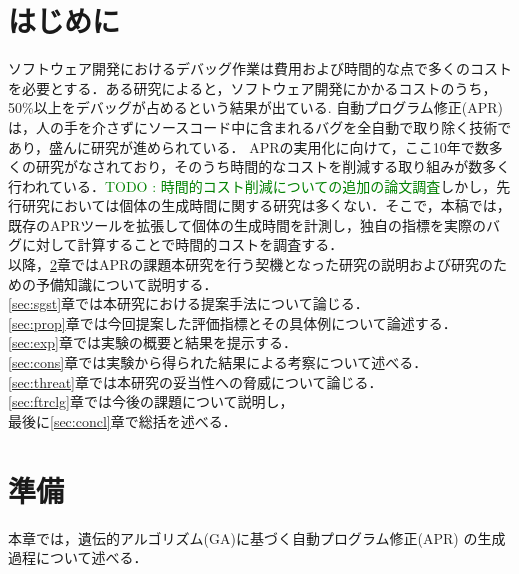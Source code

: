 \documentclass[uplatex,dvipdfmx,a4paper]{jsarticle}
\newcommand{\TODO}[1]{{\textcolor{green}{#1}}}
\let\oldcite\cite
\renewcommand{\cite}[1]{\xspace\oldcite{#1}}
\begin{document}
\section{はじめに}\label{sec:intro}
ソフトウェア開発におけるデバッグ作業は費用および時間的な点で多くのコストを必要とする．ある研究によると，ソフトウェア開発にかかるコストのうち，50\%以上をデバッグが占めるという結果が出ている\cite{5386906, Britton_reversibledebugging}.
自動プログラム修正(APR)は，人の手を介さずにソースコード中に含まれるバグを全自動で取り除く技術であり，盛んに研究が進められている\cite{gazzola2018automatic, goues2019automated}．
APRの実用化に向けて，ここ10年で数多くの研究がなされており，そのうち時間的なコストを削減する取り組みが数多く行われている\cite{id692}．\TODO{TODO : 時間的コスト削減についての追加の論文調査}しかし，先行研究においては個体の生成時間に関する研究は多くない．そこで，本稿では，既存のAPRツールを拡張して個体の生成時間を計測し，独自の指標を実際のバグに対して計算することで時間的コストを調査する．\\
以降，\ref{sec:prep}章ではAPRの課題本研究を行う契機となった研究の説明および研究のための予備知識について説明する．\\
\ref{sec:sgst}章では本研究における提案手法について論じる．\\
\ref{sec:prop}章では今回提案した評価指標とその具体例について論述する．\\
\ref{sec:exp}章では実験の概要と結果を提示する．\\
\ref{sec:cons}章では実験から得られた結果による考察について述べる．\\
\ref{sec:threat}章では本研究の妥当性への脅威について論じる．\\
\ref{sec:ftrclg}章では今後の課題について説明し，\\
最後に\ref{sec:concl}章で総括を述べる．

\clearpage
\section{準備}\label{sec:prep}
本章では，遺伝的アルゴリズム(GA)に基づく自動プログラム修正(APR) の生成過程について述べる．
\end{document}

